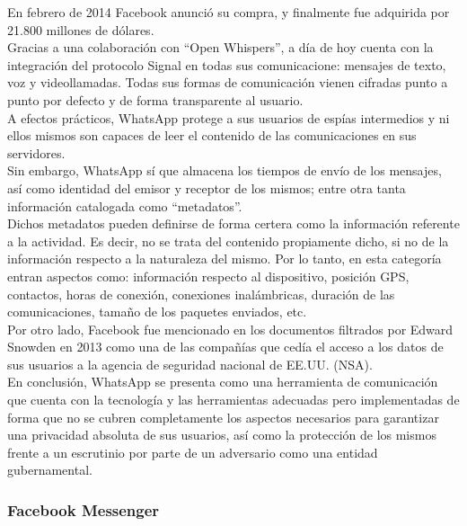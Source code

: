 En febrero de 2014 Facebook anunció su compra, y finalmente fue adquirida por 21.800 millones de dólares. \\

Gracias a una colaboración con \hyphenquote{spanish}{Open Whispers}, a día de hoy cuenta con la integración del protocolo Signal en todas sus comunicacione: mensajes de texto, voz y videollamadas. Todas sus formas de comunicación vienen cifradas punto a punto por defecto y de forma transparente al usuario. \\

A efectos prácticos, WhatsApp protege a sus usuarios de espías intermedios y ni ellos mismos son capaces de leer el contenido de las comunicaciones en sus servidores. \\


Sin embargo, WhatsApp sí que almacena los tiempos de envío de los mensajes, así como identidad del emisor y receptor de los mismos; entre otra tanta información catalogada como \hyphenquote{spanish}{metadatos}. \\

Dichos metadatos pueden definirse de forma certera como la información referente a la actividad. Es decir, no se trata del contenido propiamente dicho, si no de la información respecto a la naturaleza del mismo. Por lo tanto, en esta categoría entran aspectos como: información respecto al dispositivo, posición GPS, contactos, horas de conexión, conexiones inalámbricas, duración de las comunicaciones, tamaño de los paquetes enviados, etc. \\

Por otro lado, Facebook fue mencionado en los documentos filtrados por Edward Snowden en 2013 como una de las compañías que cedía el acceso a los datos de sus usuarios a la agencia de seguridad nacional de EE.UU. (NSA). \\

En conclusión, WhatsApp se presenta como una herramienta de comunicación que cuenta con la tecnología y las herramientas adecuadas pero implementadas de forma que no se cubren completamente los aspectos necesarios para garantizar una privacidad absoluta de sus usuarios, así como la protección de los mismos frente a un escrutinio por parte de un adversario como una entidad gubernamental. \\

\subsubsection {Facebook Messenger}

